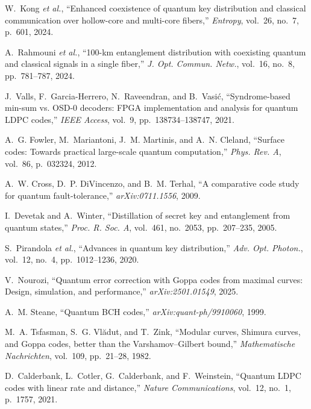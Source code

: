 \documentclass[conference]{IEEEtran}  %
\begin{document}
\begin{thebibliography}{99}
W.~Kong \emph{et al.}, ``Enhanced coexistence of quantum key distribution and classical communication over hollow-core and multi-core fibers,'' \emph{Entropy}, vol.~26, no.~7, p.~601, 2024.

A.~Rahmouni \emph{et al.}, ``100-km entanglement distribution with coexisting quantum and classical signals in a single fiber,'' \emph{J. Opt. Commun. Netw.}, vol.~16, no.~8, pp.~781--787, 2024.

J.~Valls, F.~Garcia-Herrero, N.~Raveendran, and B.~Vasić, ``Syndrome-based min-sum vs. OSD-0 decoders: FPGA implementation and analysis for quantum LDPC codes,'' \emph{IEEE Access}, vol.~9, pp.~138734--138747, 2021.

A.~G. Fowler, M.~Mariantoni, J.~M. Martinis, and A.~N. Cleland, ``Surface codes: Towards practical large-scale quantum computation,'' \emph{Phys. Rev. A}, vol.~86, p.~032324, 2012.

A.~W. Cross, D.~P. DiVincenzo, and B.~M. Terhal, ``A comparative code study for quantum fault-tolerance,'' \emph{arXiv:0711.1556}, 2009.

I.~Devetak and A.~Winter, ``Distillation of secret key and entanglement from quantum states,'' \emph{Proc. R. Soc. A}, vol.~461, no.~2053, pp.~207--235, 2005.

S.~Pirandola \emph{et al.}, ``Advances in quantum key distribution,'' \emph{Adv. Opt. Photon.}, vol.~12, no.~4, pp.~1012--1236, 2020.

V.~Nourozi, ``Quantum error correction with Goppa codes from maximal curves: Design, simulation, and performance,'' \emph{arXiv:2501.01549}, 2025.

A.~M. Steane, ``Quantum BCH codes,'' \emph{arXiv:quant-ph/9910060}, 1999.

M.~A. Tsfasman, S.~G. Vl\u{a}dut, and T.~Zink, ``Modular curves, Shimura curves, and Goppa codes, better than the Varshamov--Gilbert bound,'' \emph{Mathematische Nachrichten}, vol.~109, pp.~21--28, 1982.

D.~Calderbank, L.~Cotler, G.~Calderbank, and F.~Weinstein, ``Quantum LDPC codes with linear rate and distance,'' \emph{Nature Communications}, vol.~12, no.~1, p.~1757, 2021.

\end{thebibliography}
\end{document}
